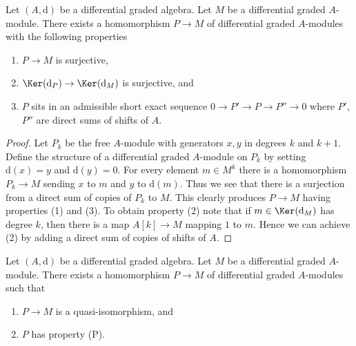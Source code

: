 \begin{lemma}
\label{lemma-good-quotient}
Let $(A, \text{d})$ be a differential graded algebra.
Let $M$ be a differential graded $A$-module. There exists a homomorphism
$P \to M$ of differential graded $A$-modules with the following
properties
\begin{enumerate}
\item $P \to M$ is surjective,
\item $\Ker(\text{d}_P) \to \Ker(\text{d}_M)$ is surjective, and
\item $P$ sits in an admissible short exact sequence
$0 \to P' \to P \to P'' \to 0$ where $P'$, $P''$ are direct sums
of shifts of $A$.
\end{enumerate}
\end{lemma}

\begin{proof}
Let $P_k$ be the free $A$-module with generators $x, y$ in degrees
$k$ and $k + 1$. Define the structure of a differential graded
$A$-module on $P_k$ by setting $\text{d}(x) = y$ and $\text{d}(y) = 0$.
For every element $m \in M^k$ there is a homomorphism
$P_k \to M$ sending $x$ to $m$ and $y$ to $\text{d}(m)$.
Thus we see that there is a surjection from a direct sum
of copies of $P_k$ to $M$. This clearly produces $P \to M$
having properties (1) and (3). To obtain property (2) note
that if $m \in \Ker(\text{d}_M)$ has degree $k$, then there is a map
$A[k] \to M$ mapping $1$ to $m$. Hence we can achieve (2) by adding
a direct sum of copies of shifts of $A$.
\end{proof}

\begin{lemma}
\label{lemma-resolve}
Let $(A, \text{d})$ be a differential graded algebra.
Let $M$ be a differential graded $A$-module. There exists a homomorphism
$P \to M$ of differential graded $A$-modules such that
\begin{enumerate}
\item $P \to M$ is a quasi-isomorphism, and
\item $P$ has property (P).
\end{enumerate}
\end{lemma}

